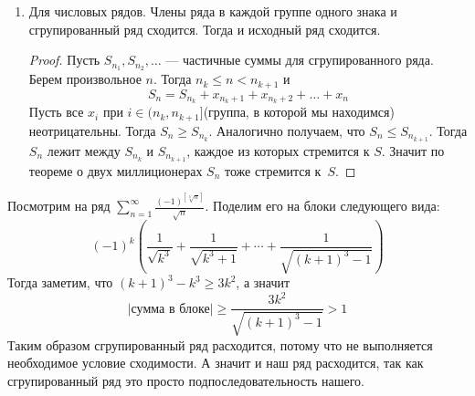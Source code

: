 \begin{enumerate}
  \item Для числовых рядов. Члены ряда в каждой группе одного знака и сгрупированный ряд сходится. Тогда и исходный ряд сходится.
  \begin{proof}
    Пусть $S_{n_1}, S_{n_2}, \dotsc$ --- частичные суммы для сгрупированного ряда. Берем произвольное $n$. Тогда $n_k \leq n < n_{k + 1}$ и
    \begin{equation*}
      S_n = S_{n_k} + x_{n_{k}+1} + x_{n_{k}+2} + \dotsc + x_n
    \end{equation*}
    Пусть все $x_i$ при $i \in (n_k, n_{k + 1}]$(группа, в которой мы находимся) неотрицательны. Тогда $S_n \geq S_{n_k}$. Аналогично получаем, что $S_n \leq S_{n_{k + 1}}$. Тогда $S_n$ лежит между $S_{n_k}$ и $S_{n_{k + 1}}$, каждое из которых стремится к $S$. Значит по теореме о двух миллиционерах $S_n$ тоже стремится к~$S$.
  \end{proof}
\end{enumerate}

\begin{example}
  Посмотрим на ряд $\sum\limits_{n = 1}^{\infty} \frac{(-1)^{[\sqrt[3]{n}]}}{\sqrt{n}}$. Поделим его на блоки следующего вида:
  \begin{equation*}
    (-1)^k \left(
      \frac{1}{\sqrt{k^3}} + \frac{1}{\sqrt{k^3 + 1}} + \dotsb + \frac{1}{\sqrt{(k + 1)^3 - 1}}
    \right)
  \end{equation*}
  Тогда заметим, что $(k + 1)^3 - k^3 \geq 3k^2$, а значит
  \begin{equation*}
    |\text{сумма в блоке}|
    \geq
    \frac{3k^2}{\sqrt{(k + 1)^3 - 1}} > 1
  \end{equation*}
  Таким образом сгрупированный ряд расходится, потому что не выполняется необходимое условие сходимости. А значит и наш ряд расходится, так как сгрупированный ряд это просто подпоследовательность нашего.
\end{example}
